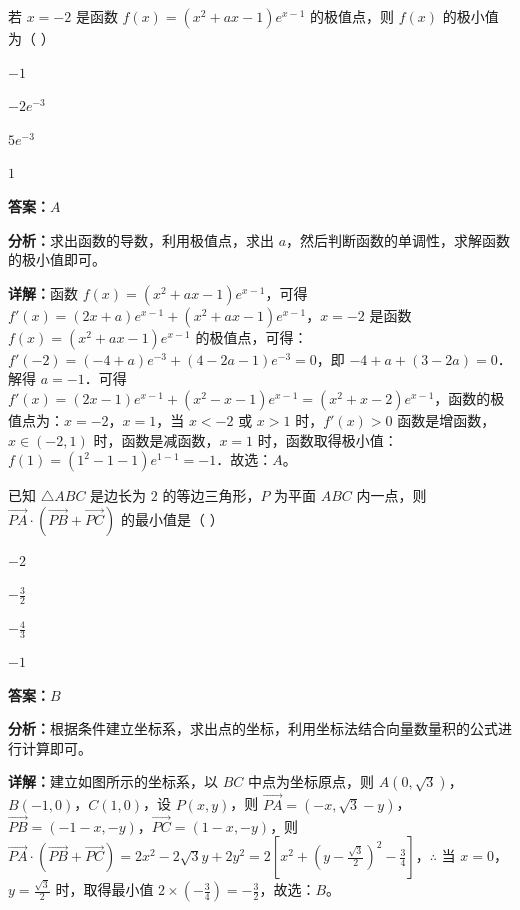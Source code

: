 \begin{question}[points=5]
若 $x=-2$ 是函数 $f(x)=(x^2+ax-1)e^{x-1}$ 的极值点，则 $f(x)$ 的极小值为（   ）
\begin{choices}
  \item $-1$
  \item $-2e^{-3}$
  \item $5e^{-3}$
  \item $1$
\end{choices}
\begin{solution}
\textbf{答案：}$A$

\textbf{分析：}求出函数的导数，利用极值点，求出 $a$，然后判断函数的单调性，求解函数的极小值即可。

\textbf{详解：}函数 $f(x)=(x^2+ax-1)e^{x-1}$，可得 $f'(x)=(2x+a)e^{x-1}+(x^2+ax-1)e^{x-1}$，$x=-2$ 是函数 $f(x)=(x^2+ax-1)e^{x-1}$ 的极值点，可得：$f'(-2)=(-4+a)e^{-3}+(4-2a-1)e^{-3}=0$，即 $-4+a+(3-2a)=0$．解得 $a=-1$．可得 $f'(x)=(2x-1)e^{x-1}+(x^2-x-1)e^{x-1}=(x^2+x-2)e^{x-1}$，函数的极值点为：$x=-2$，$x=1$，当 $x<-2$ 或 $x>1$ 时，$f'(x)>0$ 函数是增函数，$x\in(-2,1)$ 时，函数是减函数，$x=1$ 时，函数取得极小值：$f(1)=(1^2-1-1)e^{1-1}=-1$．故选：$A$。
\end{solution}
\end{question}

\begin{question}[points=5]
已知 $\triangle ABC$ 是边长为 $2$ 的等边三角形，$P$ 为平面 $ABC$ 内一点，则 $\overrightarrow{PA}\cdot(\overrightarrow{PB}+\overrightarrow{PC})$ 的最小值是（   ）
\begin{choices}
  \item $-2$
  \item $-\frac{3}{2}$
  \item $-\frac{4}{3}$
  \item $-1$
\end{choices}
\begin{solution}
\textbf{答案：}$B$

\textbf{分析：}根据条件建立坐标系，求出点的坐标，利用坐标法结合向量数量积的公式进行计算即可。

\textbf{详解：}建立如图所示的坐标系，以 $BC$ 中点为坐标原点，则 $A(0,\sqrt{3})$，$B(-1,0)$，$C(1,0)$，设 $P(x,y)$，则 $\overrightarrow{PA}=(-x,\sqrt{3}-y)$，$\overrightarrow{PB}=(-1-x,-y)$，$\overrightarrow{PC}=(1-x,-y)$，则 $\overrightarrow{PA}\cdot(\overrightarrow{PB}+\overrightarrow{PC})=2x^2-2\sqrt{3}y+2y^2=2[x^2+(y-\frac{\sqrt{3}}{2})^2-\frac{3}{4}]$，$\therefore$ 当 $x=0$，$y=\frac{\sqrt{3}}{2}$ 时，取得最小值 $2\times(-\frac{3}{4})=-\frac{3}{2}$，故选：$B$。
\end{solution}
\end{question}

